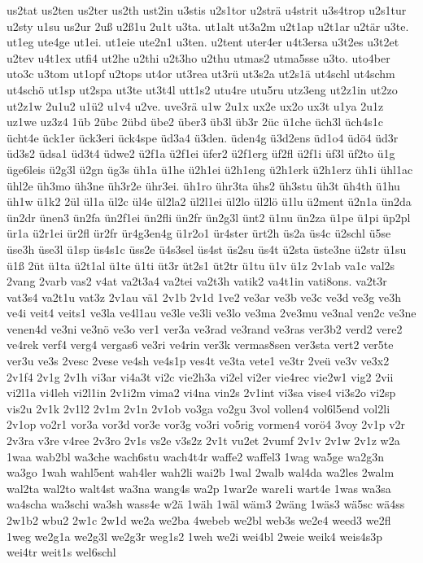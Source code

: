 {us2tat
us2ten
us2ter
us2th
ust2in
u3stis
u2s1tor
u2strä
u4strit
u3s4trop
u2s1tur
u2sty
u1su
us2ur
2uß
u2ß1u
2u1t
u3ta.
ut1alt
ut3a2m
u2t1ap
u2t1ar
u2tär
u3te.
ut1eg
ute4ge
ut1ei.
ut1eie
ute2n1
u3ten.
u2tent
uter4er
u4t3ersa
u3t2es
u3t2et
u2tev
u4t1ex
utfi4
ut2he
u2thi
u2t3ho
u2thu
utmas2
utma5sse
u3to.
uto4ber
uto3c
u3tom
ut1opf
u2tops
ut4or
ut3rea
ut3rü
ut3s2a
ut2s1ä
ut4schl
ut4schm
ut4schö
ut1sp
ut2spa
ut3te
ut3t4l
utt1s2
utu4re
utu5ru
utz3eng
ut2z1in
ut2zo
ut2z1w
2u1u2
u1ü2
u1v4
u2ve.
uve3rä
u1w
2u1x
ux2e
ux2o
ux3t
u1ya
2u1z
uz1we
uz3z4
1üb
2übc
2übd
übe2
über3
üb3l
üb3r
2üc
ü1che
üch3l
üch4s1c
ücht4e
ück1er
ück3eri
ück4spe
üd3a4
ü3den.
üden4g
ü3d2ens
üd1o4
üdö4
üd3r
üd3s2
üdsa1
üd3t4
üdwe2
ü2f1a
ü2f1ei
üfer2
ü2f1erg
üf2fl
ü2f1i
üf3l
üf2to
ü1g
üge6leis
ü2g3l
ü2gn
üg3s
üh1a
ü1he
ü2h1ei
ü2h1eng
ü2h1erk
ü2h1erz
üh1i
ühl1ac
ühl2e
üh3mo
üh3ne
üh3r2e
ühr3ei.
üh1ro
ühr3ta
ühs2
üh3stu
üh3t
üh4th
ü1hu
üh1w
ü1k2
2ül
ül1a
ül2c
ül4e
ül2la2
ül2l1ei
ül2lo
ül2lö
ü1lu
ü2ment
ü2n1a
ün2da
ün2dr
ünen3
ün2fa
ün2f1ei
ün2fli
ün2fr
ün2g3l
ünt2
ü1nu
ün2za
ü1pe
ü1pi
üp2pl
ür1a
ü2r1ei
ür2fl
ür2fr
ür4g3en4g
ü1r2o1
ür4ster
ürt2h
üs2a
üs4c
ü2schl
ü5se
üse3h
üse3l
ü1sp
üs4s1c
üss2e
ü4s3sel
üs4st
üs2su
üs4t
ü2sta
üste3ne
ü2str
ü1su
ü1ß
2üt
ü1ta
ü2t1al
ü1te
ü1ti
üt3r
üt2s1
üt2tr
ü1tu
ü1v
ü1z
2v1ab
va1c
val2s
2vang
2varb
vas2
v4at
va2t3a4
va2tei
va2t3h
vatik2
va4t1in
vati8ons.
va2t3r
vat3s4
va2t1u
vat3z
2v1au
vä1
2v1b
2v1d
1ve2
ve3ar
ve3b
ve3c
ve3d
ve3g
ve3h
ve4i
veit4
veits1
ve3la
ve4l1au
ve3le
ve3li
ve3lo
ve3ma
2ve3mu
ve3nal
ven2c
ve3ne
venen4d
ve3ni
ve3nö
ve3o
ver1
ver3a
ve3rad
ve3rand
ve3ras
ver3b2
verd2
vere2
ve4rek
verf4
verg4
vergas6
ve3ri
ve4rin
ver3k
vermas8sen
ver3sta
vert2
ver5te
ver3u
ve3s
2vesc
2vese
ve4sh
ve4s1p
ves4t
ve3ta
vete1
ve3tr
2veü
ve3v
ve3x2
2v1f4
2v1g
2v1h
vi3ar
vi4a3t
vi2c
vie2h3a
vi2el
vi2er
vie4rec
vie2w1
vig2
2vii
vi2l1a
vi4leh
vi2l1in
2v1i2m
vima2
vi4na
vin2s
2v1int
vi3sa
vise4
vi3s2o
vi2sp
vis2u
2v1k
2v1l2
2v1m
2v1n
2v1ob
vo3ga
vo2gu
3vol
vollen4
vol6l5end
vol2li
2v1op
vo2r1
vor3a
vor3d
vor3e
vor3g
vo3ri
vo5rig
vormen4
vorö4
3voy
2v1p
v2r
2v3ra
v3re
v4ree
2v3ro
2v1s
vs2e
v3s2z
2v1t
vu2et
2vumf
2v1v
2v1w
2v1z
w2a
1waa
wab2bl
wa3che
wach6stu
wach4t4r
waffe2
waffel3
1wag
wa5ge
wa2g3n
wa3go
1wah
wahl5ent
wah4ler
wah2li
wai2b
1wal
2walb
wal4da
wa2les
2walm
wal2ta
wal2to
walt4st
wa3na
wang4s
wa2p
1war2e
ware1i
wart4e
1was
wa3sa
wa4scha
wa3schi
wa3sh
wass4e
w2ä
1wäh
1wäl
wäm3
2wäng
1wäs3
wä5sc
wä4ss
2w1b2
wbu2
2w1c
2w1d
we2a
we2ba
4webeb
we2bl
web3s
we2e4
weed3
we2fl
1weg
we2g1a
we2g3l
we2g3r
weg1s2
1weh
we2i
wei4bl
2weie
weik4
weis4s3p
wei4tr
weit1s
wel6schl
}
